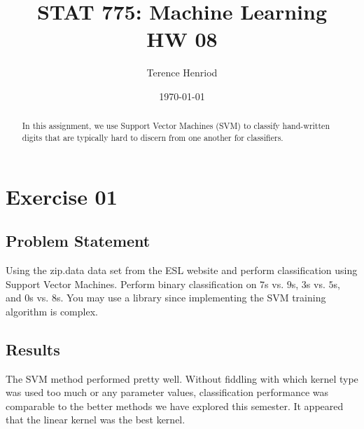 \documentclass{article}
\title{STAT 775: Machine Learning \\ HW 08}
\author{Terence Henriod}
\date{\today}
\begin{document}
\clearpage            %
\maketitle            %
\thispagestyle{empty} %

\begin{abstract}
In this assignment, we use Support Vector Machines (SVM) to classify hand-written digits that are typically hard to discern from one another for classifiers.
\end{abstract}

\newpage
\section{Exercise 01}
\subsection{Problem Statement}
Using the zip.data data set from the ESL website and perform classification using Support Vector Machines. Perform binary classification on $7$s vs. $9$s, $3$s vs. $5$s, and $0$s vs. $8$s. You may use a library since implementing the SVM training algorithm is complex.
%
%
\subsection{Results}
The SVM method performed pretty well. Without fiddling with which kernel type was used too much or any parameter values, classification performance was comparable to the better methods we have explored this semester. It appeared that the linear kernel was the best kernel.
%
\end{document}
